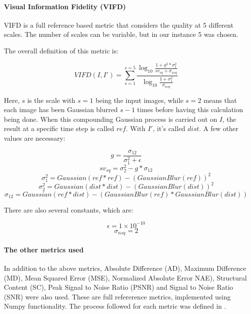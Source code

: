 \documentclass[12pt,a4paper]{article}
\begin{document}
            \paragraph{Visual Information Fidelity (VIFD)}
                VIFD is a full reference based metric that considers the quality at 5 different scales. The number of scales can be variable, but in our instance 5 was chosen.

                The overall definition of this metric is:

                $$VIFD(I, I') = \sum_{s = 1}^{s=5} \frac{
                        \log_{10} 
                        \frac{1 + g^2 * \sigma_{1}^2}
                        {sv_{sq} + \sigma_{nsq}}
                    }{
                        \log_{10}
                        \frac{1 + \sigma_{1}^2}
                        {\sigma_{nsq}}
                    }$$

                Here, $s$ is the scale with $s=1$ being the input images, while $s=2$ means that each image has been Gaussian blurred $s-1$ times before having this calculation being done.
                When this compounding Gaussian process is carried out on $I$, the result at a specific time step is called $ref$. With $I'$, it's called $dist$.
                A few other values are necessary:

                $$g = \frac{\sigma_{12}}{\sigma_{1}^2 + \epsilon}$$
                $$sv_{sq} = \sigma_{2}^2 - g*\sigma_{12}$$
                $$\sigma_{1}^2 = Gaussian(ref * ref) - (GaussianBlur(ref))^2$$
                $$\sigma_{2}^2 = Gaussian(dist * dist) - (GaussianBlur(dist))^2$$
                $$\sigma_{12} = Gaussian(ref * dist) - (GaussianBlur(ref) * GaussianBlur(dist))$$

                There are also several constants, which are:

                $$\epsilon = 1 \times 10^{-10}$$
                $$\sigma_{nsq} = 2$$

            \paragraph{The other metrics used}
                In addition to the above metrics, Absolute Difference (AD), Maximum Difference (MD), Mean Squared Error (MSE), Normalized Absolute Error NAE), Structural Content (SC),
                Peak Signal to Noise Ratio (PSNR) and Signal to Noise Ratio (SNR) were also used. These are full refererence metrics, implemented using
                Numpy functionality. The process followed for each metric was defined in \cite{ImageQualityAssessmentTest}.
\end{document}
